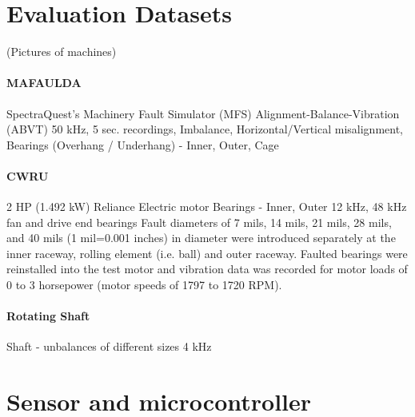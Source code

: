 \section{Evaluation Datasets}
(Pictures of machines)

\paragraph{MAFAULDA}
SpectraQuest's Machinery Fault Simulator (MFS) Alignment-Balance-Vibration (ABVT)
50 kHz, 5 sec. recordings, Imbalance, Horizontal/Vertical misalignment, Bearings (Overhang / Underhang) - Inner, Outer, Cage

\cite{noauthor_mafaulda_nodate}

\paragraph{CWRU}
2 HP (1.492 kW) Reliance Electric motor
Bearings - Inner, Outer
12 kHz, 48 kHz
fan and drive end bearings
Fault diameters of 7 mils, 14 mils, 21 mils, 28 mils, and 40 mils (1 mil=0.001 inches) in diameter were introduced separately at the inner raceway, rolling element (i.e. ball) and outer raceway. 
Faulted bearings were reinstalled into the test motor and vibration data was recorded for motor loads of 0 to 3 horsepower (motor speeds of 1797 to 1720 RPM).

\cite{jamil_feature-based_2021}
\cite{mey_machine_2020}

\paragraph{Rotating Shaft}
Shaft -  unbalances of different sizes
4 kHz

\section{Sensor and microcontroller}
\cite{hu_intelligent_2012} 
